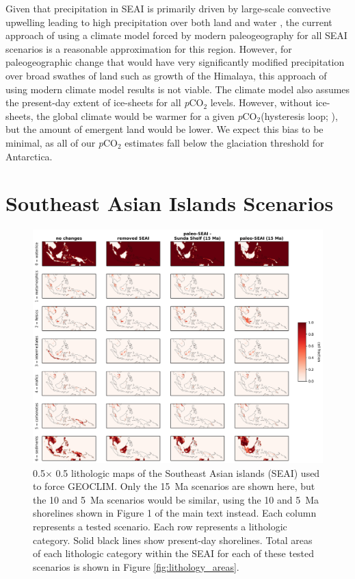 \documentclass[11pt,letterpaper]{article}
\newcommand{\degrees}{\textdegree\xspace}
\newcommand{\pCOtwo}{\textit{p}CO$_{2}$\xspace}
\begin{document}
Given that precipitation in SEAI is primarily driven by large-scale convective upwelling leading to high precipitation over both land and water \citep{Donohoe2017a}, the current approach of using a climate model forced by modern paleogeography for all SEAI scenarios is a reasonable approximation for this region. However, for paleogeographic change that would have very significantly modified precipitation over broad swathes of land such as growth of the Himalaya, this approach of using modern climate model results is not viable. The climate model also assumes the present-day extent of ice-sheets for all \pCOtwo levels. However, without ice-sheets, the global climate would be warmer for a given \pCOtwo (hysteresis loop; \citealp{Pollard2005b}), but the amount of emergent land would be lower. We expect this bias to be minimal, as all of our \pCOtwo estimates fall below the glaciation threshold for Antarctica.

\section*{Southeast Asian Islands Scenarios}

\begin{figure}[h!]
    \centering
    \includegraphics[width=1\textwidth]{Figures/SEAI_fracs.jpg}
    \caption{0.5\degrees $\times$ 0.5\degrees lithologic maps of the Southeast Asian islands (SEAI) used to force GEOCLIM. Only the 15~Ma scenarios are shown here, but the 10 and 5~Ma scenarios would be similar, using the 10 and 5~Ma shorelines shown in Figure 1 of the main text instead. Each column represents a tested scenario. Each row represents a lithologic category. Solid black lines show present-day shorelines. Total areas of each lithologic category within the SEAI for each of these tested scenarios is shown in Figure \ref{fig:lithology_areas}.}
    \label{fig:SEAI_fracs}
\end{figure}
\end{document}
